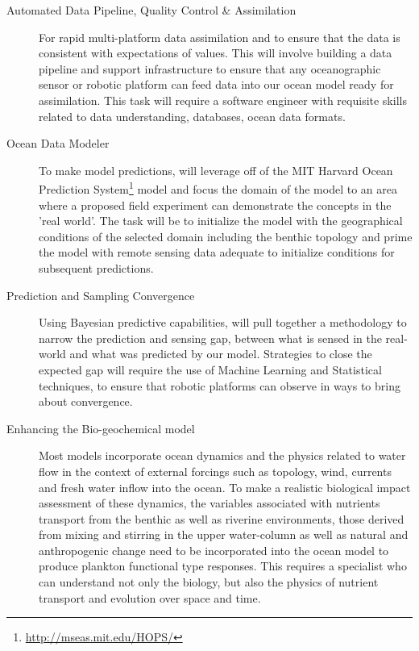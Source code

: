 \begin{description}

\item[Automated Data Pipeline, Quality Control \& Assimilation] For
  rapid multi-platform data assimilation and to ensure that the data is
  consistent with expectations of values. This will involve building a
  data pipeline and support infrastructure to ensure that any
  oceanographic sensor or robotic platform can feed data into our ocean
  model ready for assimilation. This task will require a software
  engineer with requisite skills related to data understanding,
  databases, ocean data formats.

\item[Ocean Data Modeler] To make model predictions, \pro will
  leverage off of the MIT Harvard Ocean Prediction
  System\footnote{\url{http://mseas.mit.edu/HOPS/}} model and focus
  the domain of the model to an area where a proposed field experiment
  can demonstrate the concepts in the 'real world'. The task will be
  to initialize the model with the geographical conditions of the
  selected domain including the benthic topology and prime the model
  with remote sensing data adequate to initialize conditions for
  subsequent predictions.

\item[Prediction and Sampling Convergence] Using Bayesian predictive
  capabilities, \pro will pull together a methodology to narrow the
  prediction and sensing gap, between what is sensed in the real-world
  and what was predicted by our model. Strategies to close the expected
  gap will require the use of Machine Learning and Statistical
  techniques, to ensure that robotic platforms can observe in ways to
  bring about convergence. 

\item[Enhancing the Bio-geochemical model] Most models incorporate ocean
  dynamics and the physics related to water flow in the context of
  external forcings such as topology, wind, currents and fresh water
  inflow into the ocean. To make a realistic biological impact
  assessment of these dynamics, the variables associated with nutrients
  transport from the benthic as well as riverine environments, those
  derived from mixing and stirring in the upper water-column as well as
  natural and anthropogenic change need to be incorporated into the
  ocean model to produce plankton functional type responses. This
  requires a specialist who can understand not only the biology, but
  also the physics of nutrient transport and evolution over space and
  time.


\end{description}
